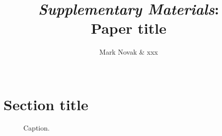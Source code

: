 \documentclass[11pt]{article}
\title{
	\emph{Supplementary Materials}:\\
	Paper title}
\author
{Mark Novak \& xxx \\\\
}
\date{}
\renewcommand*{\arraystretch}{1.8} %
\begin{document}
\maketitle

\setpagewiselinenumbers
\nolinenumbers



\renewcommand{\thesection}{S\arabic{section}}
\renewcommand{\thefigure}{S\arabic{figure}}
\renewcommand{\thetable}{S\arabic{table}}
\renewcommand{\theequation}{S\arabic{equation}}

\setcounter{page}{1}
\setcounter{figure}{0}
\setcounter{table}{0}
\setcounter{equation}{0}

\baselineskip12pt
\tableofcontents

	
\clearpage



\section{Section title}


\footnotesize
\setlength{\LTcapwidth}{1\textwidth} %
\renewcommand*{\arraystretch}{2} %

	

\renewcommand*{\arraystretch}{1} %
\normalsize
\baselineskip30pt


\clearpage

\begin{figure}[!h]
	\caption{
		\baselineskip15pt
		Caption.
	}
	\label{fig:myfig}
\end{figure}

\clearpage


\clearpage



\end{document}
